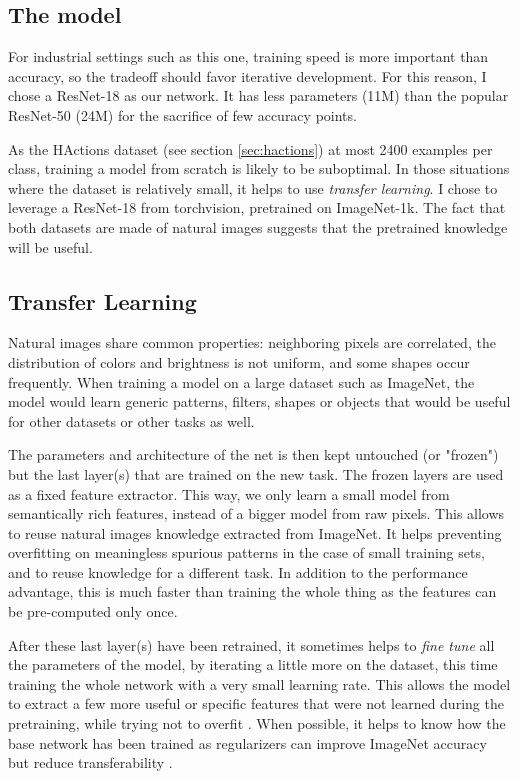 \subsection{The model}

For industrial settings such as this one, training speed is more important than accuracy, so the tradeoff should favor iterative development. For this reason, I chose a ResNet-18 as our network. It has less parameters (11M) than the popular ResNet-50 (24M) for the sacrifice of few accuracy points.

As the HActions dataset (see section \ref{sec:hactions}) at most 2400 examples per class, training a model from scratch is likely to be suboptimal. In those situations where the dataset is relatively small, it helps to use \emph{transfer learning}. I chose to leverage a ResNet-18 from torchvision, pretrained on ImageNet-1k. The fact that both datasets are made of natural images suggests that the pretrained knowledge will be useful.


\subsection{Transfer Learning}

Natural images share common properties: neighboring pixels are correlated, the distribution of colors and brightness is not uniform, and some shapes occur frequently. When training a model on a large dataset such as ImageNet, the model would learn generic patterns, filters, shapes or objects that would be useful for other datasets or other tasks as well.

The parameters and architecture of the net is then kept untouched (or "frozen") but the last layer(s) that are trained on the new task. The frozen layers are used as a fixed feature extractor. This way, we only learn a small model from semantically rich features, instead of a bigger model from raw pixels. This allows to reuse natural images knowledge extracted from ImageNet. It helps preventing overfitting on meaningless spurious patterns in the case of small training sets, and to reuse knowledge for a different task. In addition to the performance advantage, this is much faster than training the whole thing as the features can be pre-computed only once.

After these last layer(s) have been retrained, it sometimes helps to \emph{fine tune} all the parameters of the model, by iterating a little more on the dataset, this time training the whole network with a very small learning rate. This allows the model to extract a few more useful or specific features that were not learned during the pretraining, while trying not to overfit . When possible, it helps to know how the base network has been trained as regularizers can improve ImageNet accuracy but reduce transferability \citep{imagenettransfer,crossentropytransfer}.


